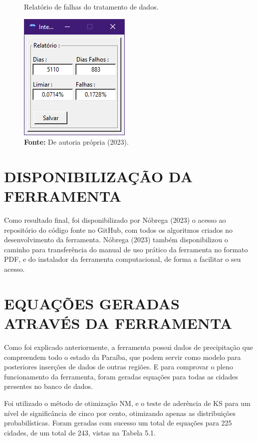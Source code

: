 \begin{figure}[!ht]
	\centering
	\caption{Relatório de falhas do tratamento de dados.}
	\includegraphics[width=.21\linewidth]{figuras/relatorio_de_falhas.png}
	\caption*{\textbf{Fonte:} De autoria própria (2023).}
	\label{fig:figuras/relatorio_de_falhas.png}
\end{figure}

\section{DISPONIBILIZAÇÃO DA FERRAMENTA}

Como resultado final, foi disponibilizado por Nóbrega (2023) o acesso ao repositório do código fonte no GitHub, com todos os algoritmos criados no desenvolvimento da ferramenta. Nóbrega (2023) também disponibilizou o caminho para transferência do manual de uso prático da ferramenta no formato PDF, e do instalador da ferramenta computacional, de forma a facilitar o seu acesso.\bigskip

\section{EQUAÇÕES GERADAS ATRAVÉS DA FERRAMENTA}

Como foi explicado anteriormente, a ferramenta possui dados de precipitação que compreendem todo o estado da Paraíba, que podem servir como modelo para posteriores inserções de dados de outras regiões. E para comprovar o pleno funcionamento da ferramenta, foram geradas equações para todas as cidades presentes no banco de dados. 

Foi utilizado o método de otimização NM, e o teste de aderência de KS para um nível de significância de cinco por cento, otimizando apenas as distribuições probabilísticas. Foram geradas com sucesso um total de equações para 225 cidades, de um total de 243, vistas na Tabela 5.1.\bigskip

\newpage


